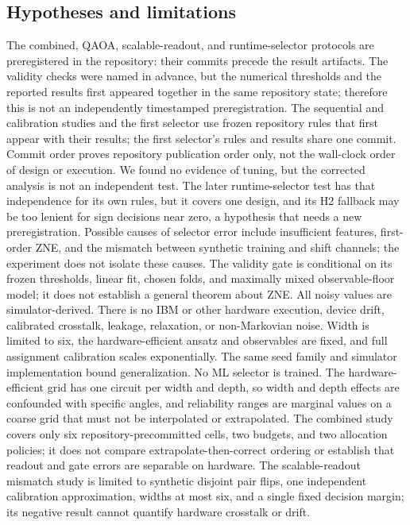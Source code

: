 \documentclass[10pt,twocolumn]{article}
\begin{document}
\subsection{Hypotheses and limitations}
The combined, QAOA, scalable-readout, and runtime-selector protocols are preregistered in the repository:
their commits precede the result artifacts. The validity checks were named in advance, but the numerical thresholds and the reported results first appeared together in the same repository state; therefore this is not an independently timestamped preregistration. The sequential and calibration studies and the first selector use frozen repository
rules that first appear with their results; the first selector's rules and results share one commit. Commit
order proves repository publication order only, not the wall-clock order of design or execution. We found no evidence of
tuning, but the corrected analysis is not an independent test. The later runtime-selector test
has that independence for its own rules, but it covers one design, and its H2 fallback may be too
lenient for sign decisions near zero, a hypothesis that needs a new preregistration.
Possible causes of selector error include insufficient features, first-order ZNE,
and the mismatch between synthetic training and shift channels; the experiment does
not isolate these causes. The validity gate is conditional on its frozen thresholds,
linear fit, chosen folds, and maximally mixed observable-floor model; it does not
establish a general theorem about ZNE. All noisy values are simulator-derived. There
is no IBM or other hardware execution, device drift, calibrated crosstalk, leakage,
relaxation, or non-Markovian noise. Width is limited to six, the hardware-efficient ansatz and
observables are fixed, and full assignment calibration scales exponentially. The
same seed family and simulator implementation bound generalization. No ML selector
is trained. The hardware-efficient grid has one circuit per width and depth, so width and depth
effects are confounded with specific angles, and reliability ranges are marginal values on a
coarse grid that must not be interpolated or extrapolated. The combined study covers
only six repository-precommitted cells, two budgets, and two allocation policies; it does not
compare extrapolate-then-correct ordering or establish that readout and gate errors
are separable on hardware.
The scalable-readout mismatch study is limited to synthetic disjoint pair flips,
one independent calibration approximation, widths at most six, and a single fixed
decision margin; its negative result cannot quantify hardware crosstalk or drift.
\end{document}
